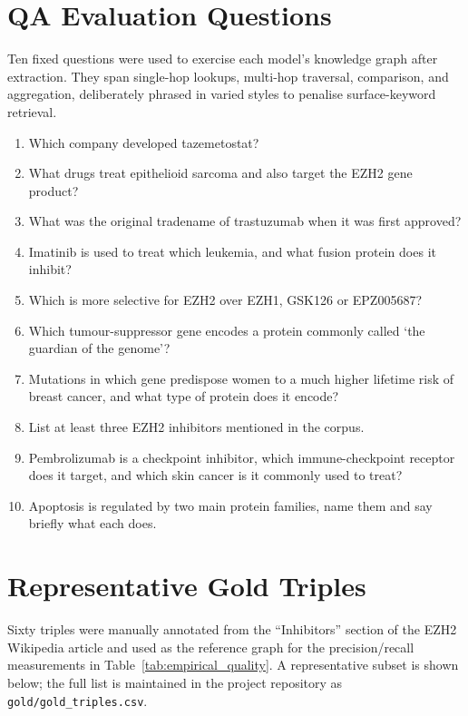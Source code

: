 \documentclass[12pt,a4paper,oneside]{report}
\begin{document}
\begin{appendices}
\section{QA Evaluation Questions}
\label{app:qa_questions}

Ten fixed questions were used to exercise each model's knowledge graph
after extraction. They span single-hop lookups, multi-hop traversal,
comparison, and aggregation, deliberately phrased in varied styles to
penalise surface-keyword retrieval.

\begin{enumerate}[leftmargin=2em,itemsep=2pt]
    \item Which company developed tazemetostat?
    \item What drugs treat epithelioid sarcoma and also target the EZH2
          gene product?
    \item What was the original tradename of trastuzumab when it was
          first approved?
    \item Imatinib is used to treat which leukemia, and what fusion
          protein does it inhibit?
    \item Which is more selective for EZH2 over EZH1, GSK126 or
          EPZ005687?
    \item Which tumour-suppressor gene encodes a protein commonly called
          `the guardian of the genome'?
    \item Mutations in which gene predispose women to a much higher
          lifetime risk of breast cancer, and what type of protein does
          it encode?
    \item List at least three EZH2 inhibitors mentioned in the corpus.
    \item Pembrolizumab is a checkpoint inhibitor, which
          immune-checkpoint receptor does it target, and which skin
          cancer is it commonly used to treat?
    \item Apoptosis is regulated by two main protein families, name
          them and say briefly what each does.
\end{enumerate}

\section{Representative Gold Triples}
\label{app:gold_triples}

Sixty triples were manually annotated from the ``Inhibitors'' section
of the EZH2 Wikipedia article and used as the reference graph for the
precision/recall measurements in
Table~\ref{tab:empirical_quality}. A representative subset is shown
below; the full list is maintained in the project repository as
\texttt{gold/gold\_triples.csv}.


\end{appendices}
\end{document}

